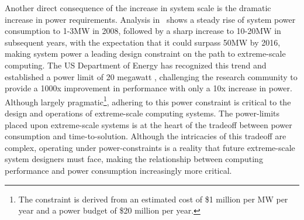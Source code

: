 Another direct consequence of the increase in system scale is the dramatic increase in
power requirements. Analysis in~\cite{doe_ascr_exascale_2011} shows a steady rise of system power consumption to 1-3MW in 
2008, followed by a sharp increase to 10-20MW in subsequent years, with the expectation that
it could surpass 50MW by 2016, making system power a leading design constraint on the path to extreme-scale computing. The US Department of Energy has recognized this trend and established a power 
limit of 20 megawatt \cite{doe_ascr_exascale_2011}, challenging the research community to provide 
a 1000x improvement in performance with only a 10x increase in power. Although largely pragmatic\footnote{The constraint is derived from an estimated cost of \$1 million
per MW per year and a power budget of \$20 million per year.}, adhering to 
this power constraint is critical to the design 
and operations of extreme-scale computing systems. The power-limits placed upon extreme-scale systems 
is at the heart of the tradeoff between power consumption and time-to-solution. Although the 
intricacies of this tradeoff are complex, operating under power-constraints is a reality that 
future extreme-scale system designers must face, making the relationship between computing performance
and power consumption increasingly more critical.


